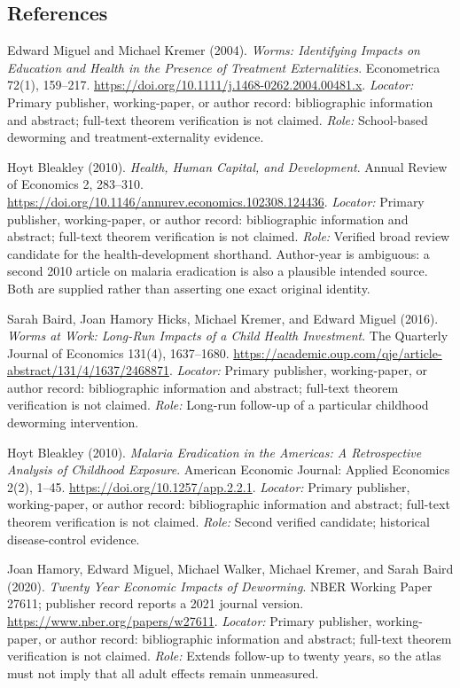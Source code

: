 \documentclass[11pt,a4paper]{article}
\begin{document}
\subsection*{References}
\begin{enumerate}[label=\textnormal{[S\arabic*]},leftmargin=*]
\item Edward Miguel and Michael Kremer (2004). \emph{Worms: Identifying Impacts on Education and Health in the Presence of Treatment Externalities}. Econometrica 72(1), 159--217. \url{https://doi.org/10.1111/j.1468-0262.2004.00481.x}. \textit{Locator:} Primary publisher, working-paper, or author record: bibliographic information and abstract; full-text theorem verification is not claimed. \textit{Role:} School-based deworming and treatment-externality evidence.
\item Hoyt Bleakley (2010). \emph{Health, Human Capital, and Development}. Annual Review of Economics 2, 283--310. \url{https://doi.org/10.1146/annurev.economics.102308.124436}. \textit{Locator:} Primary publisher, working-paper, or author record: bibliographic information and abstract; full-text theorem verification is not claimed. \textit{Role:} Verified broad review candidate for the health-development shorthand. Author-year is ambiguous: a second 2010 article on malaria eradication is also a plausible intended source. Both are supplied rather than asserting one exact original identity.
\item Sarah Baird, Joan Hamory Hicks, Michael Kremer, and Edward Miguel (2016). \emph{Worms at Work: Long-Run Impacts of a Child Health Investment}. The Quarterly Journal of Economics 131(4), 1637--1680. \url{https://academic.oup.com/qje/article-abstract/131/4/1637/2468871}. \textit{Locator:} Primary publisher, working-paper, or author record: bibliographic information and abstract; full-text theorem verification is not claimed. \textit{Role:} Long-run follow-up of a particular childhood deworming intervention.
\item Hoyt Bleakley (2010). \emph{Malaria Eradication in the Americas: A Retrospective Analysis of Childhood Exposure}. American Economic Journal: Applied Economics 2(2), 1--45. \url{https://doi.org/10.1257/app.2.2.1}. \textit{Locator:} Primary publisher, working-paper, or author record: bibliographic information and abstract; full-text theorem verification is not claimed. \textit{Role:} Second verified candidate; historical disease-control evidence.
\item Joan Hamory, Edward Miguel, Michael Walker, Michael Kremer, and Sarah Baird (2020). \emph{Twenty Year Economic Impacts of Deworming}. NBER Working Paper 27611; publisher record reports a 2021 journal version. \url{https://www.nber.org/papers/w27611}. \textit{Locator:} Primary publisher, working-paper, or author record: bibliographic information and abstract; full-text theorem verification is not claimed. \textit{Role:} Extends follow-up to twenty years, so the atlas must not imply that all adult effects remain unmeasured.
\end{enumerate}
\end{document}

